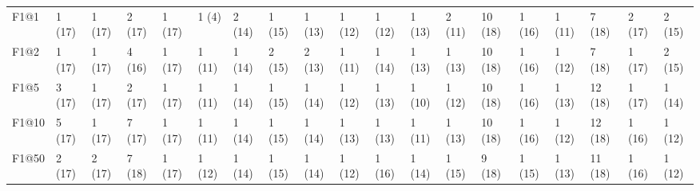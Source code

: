 \begin{tabular}{lllllllllllllllllll}
F1@1         &       1 (17) &             1 (17) &        2 (17) &          1 (17) &     1 (4) &                            2 (14) &                         1 (15) &                             1 (13) &         1 (12) &             1 (12) &             1 (13) &             2 (11) &  10 (18) &                    1 (16) &          1 (11) &   7 (18) &  2 (17) &    2 (15) \\
F1@2         &       1 (17) &             1 (17) &        4 (16) &          1 (17) &    1 (11) &                            1 (14) &                         2 (15) &                             2 (13) &         1 (11) &             1 (14) &             1 (13) &             1 (13) &  10 (18) &                    1 (16) &          1 (12) &   7 (18) &  1 (17) &    2 (15) \\
F1@5         &       3 (17) &             1 (17) &        2 (17) &          1 (17) &    1 (11) &                            1 (14) &                         1 (15) &                             1 (14) &         1 (12) &             1 (13) &             1 (10) &             1 (12) &  10 (18) &                    1 (16) &          1 (13) &  12 (18) &  1 (17) &    1 (14) \\
F1@10        &       5 (17) &             1 (17) &        7 (17) &          1 (17) &    1 (11) &                            1 (14) &                         1 (15) &                             1 (14) &         1 (13) &             1 (13) &             1 (11) &             1 (13) &  10 (18) &                    1 (16) &          1 (12) &  12 (18) &  1 (16) &    1 (12) \\
F1@50        &       2 (17) &             2 (17) &        7 (18) &          1 (17) &    1 (12) &                            1 (14) &                         1 (15) &                             1 (14) &         1 (12) &             1 (16) &             1 (14) &             1 (15) &   9 (18) &                    1 (15) &          1 (13) &  11 (18) &  1 (16) &    1 (12) \\
\bottomrule
\end{tabular}
